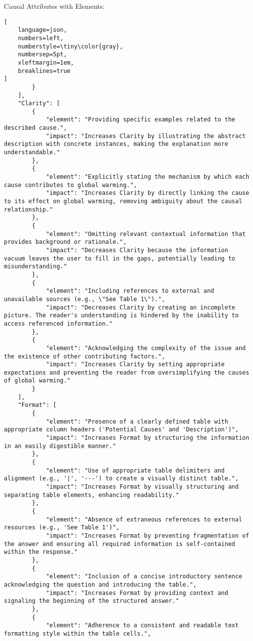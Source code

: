 \begin{promptbox}{Causal Attributes with Elements:}
\begin{lstlisting}[
    language=json,
    numbers=left,
    numberstyle=\tiny\color{gray},
    numbersep=5pt,
    xleftmargin=1em,
    breaklines=true
]
        }
    ],
    "Clarity": [
        {
            "element": "Providing specific examples related to the described cause.",
            "impact": "Increases Clarity by illustrating the abstract description with concrete instances, making the explanation more understandable."
        },
        {
            "element": "Explicitly stating the mechanism by which each cause contributes to global warming.",
            "impact": "Increases Clarity by directly linking the cause to its effect on global warming, removing ambiguity about the causal relationship."
        },
        {
            "element": "Omitting relevant contextual information that provides background or rationale.",
            "impact": "Decreases Clarity because the information vacuum leaves the user to fill in the gaps, potentially leading to misunderstanding."
        },
        {
            "element": "Including references to external and unavailable sources (e.g., \"See Table 1\").",
            "impact": "Decreases Clarity by creating an incomplete picture. The reader's understanding is hindered by the inability to access referenced information."
        },
        {
            "element": "Acknowledging the complexity of the issue and the existence of other contributing factors.",
            "impact": "Increases Clarity by setting appropriate expectations and preventing the reader from oversimplifying the causes of global warming."
        }
    ],
    "Format": [
        {
            "element": "Presence of a clearly defined table with appropriate column headers ('Potential Causes' and 'Description')",
            "impact": "Increases Format by structuring the information in an easily digestible manner."
        },
        {
            "element": "Use of appropriate table delimiters and alignment (e.g., '|', '---') to create a visually distinct table.",
            "impact": "Increases Format by visually structuring and separating table elements, enhancing readability."
        },
        {
            "element": "Absence of extraneous references to external resources (e.g., 'See Table 1')",
            "impact": "Increases Format by preventing fragmentation of the answer and ensuring all required information is self-contained within the response."
        },
        {
            "element": "Inclusion of a concise introductory sentence acknowledging the question and introducing the table.",
            "impact": "Increases Format by providing context and signaling the beginning of the structured answer."
        },
        {
            "element": "Adherence to a consistent and readable text formatting style within the table cells.",

\end{lstlisting}
\end{promptbox}
